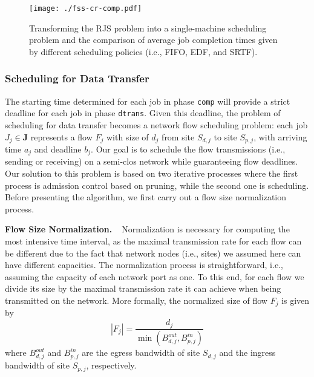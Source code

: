 \documentclass{article}
\newcommand{\bpara}[2]{\noindent\textbf{#1~~}{#2}}
\begin{document}
\begin{figure}
\centering
\texttt{[image: ./fss-cr-comp.pdf]}
\caption{\label{fig:fss-cr-comp}Transforming the RJS problem into a single-machine scheduling problem and the comparison of average job completion times given by different scheduling policies (i.e., FIFO, EDF, and SRTF).}
\end{figure}



\subsubsection{Scheduling for Data Transfer}

The starting time determined for each job in phase \texttt{comp} will provide a strict deadline for each job in phase \texttt{dtrans}. Given this deadline, the problem of scheduling for data transfer becomes a network flow scheduling problem: each job $J_j \in \mathbf{J}$ represents a flow $F_j$ with size of $d_j$ from site $S_{d,j}$ to site $S_{p,j}$, with arriving time $a_j$ and deadline $b_j$. Our goal is to schedule the flow transmissions (i.e., sending or receiving) on a semi-clos network while guaranteeing flow deadlines. Our solution to this problem is based on two iterative processes where the first process is admission control based on pruning, while the second one is scheduling. Before presenting the algorithm, we first carry out a flow size normalization process. 

\bpara{Flow Size Normalization.}Normalization is necessary for computing the most intensive time interval, as the maximal transmission rate for each flow can be different due to the fact that network nodes (i.e., sites) we assumed here can have different capacities. The normalization process is straightforward, i.e., assuming the capacity of each network port as one. To this end, for each flow we divide its size by the maximal transmission rate it can achieve when being transmitted on the network. More formally, the normalized size of flow $F_j$ is given by 
\begin{equation}
|F_j| = \frac{d_j}{\min(B_{d,j}^{out}, B_{p,j}^{in})}
\end{equation}
where $B_{d,j}^{out}$ and $B_{p,j}^{in}$ are the egress bandwidth of site $S_{d,j}$ and the ingress bandwidth of site $S_{p,j}$, respectively.
\end{document}
